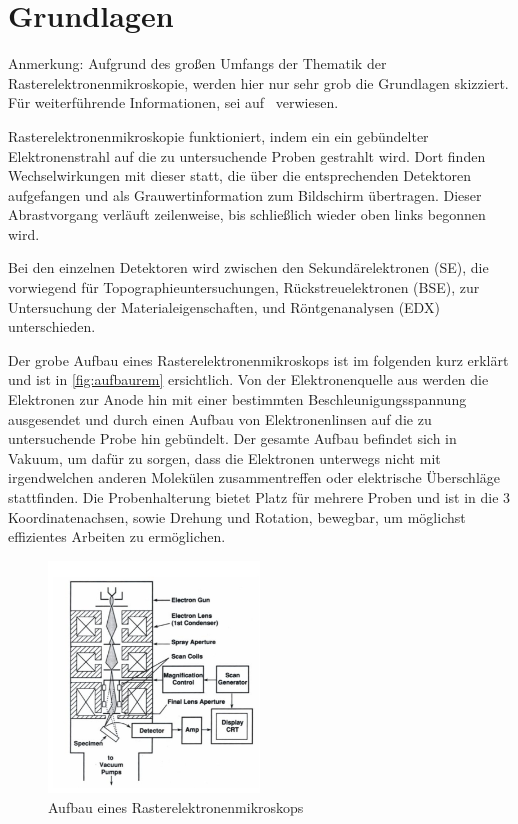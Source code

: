 \documentclass[12pt,english,ngerman]{scrartcl}
\begin{document}


\section{Grundlagen}

Anmerkung: Aufgrund des großen Umfangs der Thematik der
Rasterelektronenmikroskopie, werden hier nur sehr grob die Grundlagen
skizziert. Für weiterführende Informationen, sei auf~\cite{unterlagen}
verwiesen.

Rasterelektronenmikroskopie funktioniert, indem ein ein gebündelter
Elektronenstrahl auf die zu untersuchende Proben gestrahlt wird. Dort finden
Wechselwirkungen mit dieser statt, die über die entsprechenden Detektoren
aufgefangen und als Grauwertinformation zum Bildschirm übertragen. Dieser
Abrastvorgang verläuft zeilenweise, bis schließlich wieder oben links begonnen
wird.

Bei den einzelnen Detektoren wird zwischen den Sekundärelektronen (SE), die
vorwiegend für Topographieuntersuchungen, Rückstreuelektronen (BSE), zur
Untersuchung der Materialeigenschaften, und Röntgenanalysen (EDX)
unterschieden.

Der grobe Aufbau eines Rasterelektronenmikroskops ist im folgenden kurz erklärt
und ist in \autoref{fig:aufbaurem} ersichtlich. Von der Elektronenquelle aus
werden die Elektronen zur Anode hin mit einer bestimmten
Beschleunigungsspannung ausgesendet und durch einen Aufbau von Elektronenlinsen
auf die zu untersuchende Probe hin gebündelt. Der gesamte Aufbau befindet sich
in Vakuum, um dafür zu sorgen, dass die Elektronen unterwegs nicht mit
irgendwelchen anderen Molekülen zusammentreffen oder elektrische Überschläge
stattfinden. Die Probenhalterung bietet Platz für mehrere Proben und ist in die
3 Koordinatenachsen, sowie Drehung und Rotation, bewegbar, um möglichst
effizientes Arbeiten zu ermöglichen.~\cite{unterlagen}

\begin{figure}[]
	\begin{center}
		\includegraphics[width =0.5\textwidth]{./figures/aufbaurem.png}
	\end{center}
	\caption[Aufbau eines Rasterelektronenmikroskops]{Aufbau eines
		Rasterelektronenmikroskops~\cite{unterlagen}
	}\label{fig:aufbaurem}
\end{figure}
\end{document}
